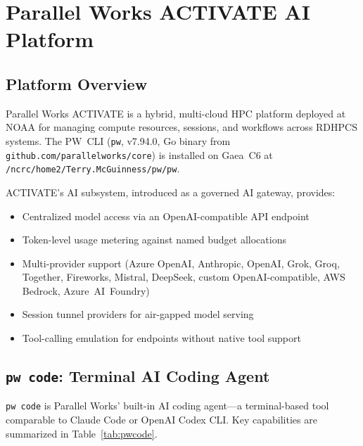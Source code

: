 \documentclass[11pt,letterpaper,twoside]{article}
\begin{document}
\section{Parallel Works ACTIVATE AI Platform}
\label{sec:pwactivate}

\subsection{Platform Overview}

Parallel Works ACTIVATE is a hybrid, multi-cloud HPC platform deployed at
NOAA for managing compute resources, sessions, and workflows across RDHPCS
systems. The PW~CLI (\texttt{pw}, v7.94.0, Go binary from
\texttt{github.com/parallelworks/core}) is installed on Gaea~C6 at
\texttt{/ncrc/home2/Terry.McGuinness/pw/pw}.

ACTIVATE's AI subsystem, introduced as a governed AI gateway, provides:
\begin{itemize}
\item Centralized model access via an OpenAI-compatible API endpoint
\item Token-level usage metering against named budget allocations
\item Multi-provider support (Azure OpenAI, Anthropic, OpenAI, Grok, Groq,
  Together, Fireworks, Mistral, DeepSeek, custom OpenAI-compatible, AWS
  Bedrock, Azure~AI~Foundry)
\item Session tunnel providers for air-gapped model serving
\item Tool-calling emulation for endpoints without native tool support
\end{itemize}

\subsection{\texttt{pw code}: Terminal AI Coding Agent}

\texttt{pw code} is Parallel Works' built-in AI coding agent---a
terminal-based tool comparable to Claude Code or OpenAI Codex CLI. Key
capabilities are summarized in Table~\ref{tab:pwcode}.
\end{document}
